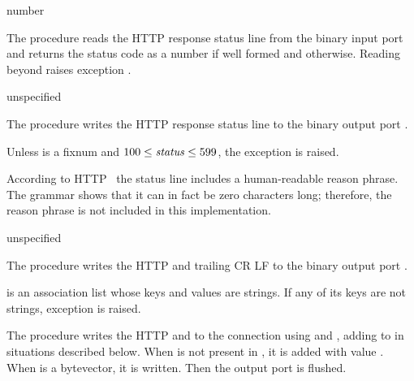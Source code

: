\begin{procedure}
\end{procedure}
\returns{} number \alt{} 

The  procedure reads the HTTP response status
line from the binary input port  and returns the status code
as a number if well formed and  otherwise. Reading beyond
 raises exception .

\begin{procedure}
\end{procedure}
\returns{} unspecified

The  procedure writes the HTTP response
status line to the binary output port .

Unless  is a fixnum and $100 \leq \var{status} \leq 599$, the
exception  is
raised.

According to HTTP~\cite{RFC7230} the status line includes a
human-readable reason phrase. The grammar shows that it can in fact be
zero characters long; therefore, the reason phrase is not included in
this implementation.

\begin{procedure}
\end{procedure}
\returns{} unspecified

The  procedure writes the HTTP
 and trailing CR LF to the binary output port
.

 is an association list whose keys and values are
strings. If any of its keys are not strings, exception
 is raised.

\begin{procedure}
\end{procedure}
\returns{} 

The  procedure writes the HTTP  and
 to the connection  using
 and , adding
 to  in situations described
below. When  is not present in ,
it is added with value . When  is a
bytevector, it is written. Then the output port is flushed.

